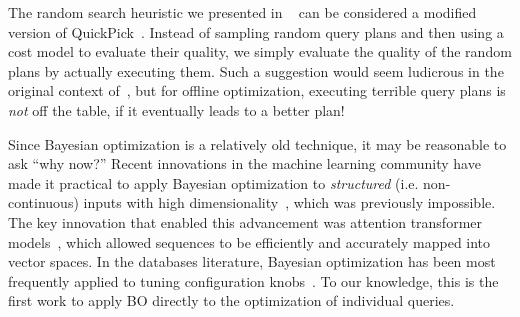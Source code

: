 
The random search heuristic we presented in ~ can be considered a modified version of QuickPick~\cite{quickpick}. Instead of sampling random query plans and then using a cost model to evaluate their quality, we simply evaluate the quality of the random plans by actually executing them. Such a suggestion would seem ludicrous in the original context of~\cite{quickpick}, but for offline optimization, executing terrible query plans is \emph{not} off the table, if it eventually leads to a better plan! 

Since Bayesian optimization is a relatively old technique, it may be reasonable to ask ``why now?'' Recent innovations in the machine learning community have made it practical to apply Bayesian optimization to \emph{structured} (i.e. non-continuous) inputs with high dimensionality~\cite{lolbo,high_dim_bo,bayes_local}, which was previously impossible. The key innovation that enabled this advancement was attention transformer models~\cite{attention}, which allowed sequences to be efficiently and accurately mapped into vector spaces. In the databases literature, Bayesian optimization has been most frequently applied to tuning configuration knobs~\cite{database_hyperparameter_optimization, cgptuner, gptuner}. To our knowledge, this is the first work to apply BO directly to the optimization of individual queries.

